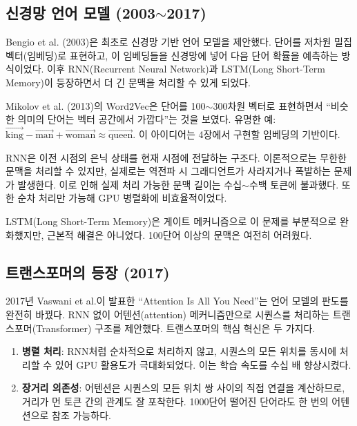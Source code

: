 \subsection{신경망 언어 모델 (2003$\sim$2017)}

Bengio et al. (2003)은 최초로 신경망 기반 언어 모델을 제안했다. 단어를 저차원 밀집 벡터(임베딩)로 표현하고, 이 임베딩들을 신경망에 넣어 다음 단어 확률을 예측하는 방식이었다. 이후 RNN(Recurrent Neural Network)과 LSTM(Long Short-Term Memory)이 등장하면서 더 긴 문맥을 처리할 수 있게 되었다.

\begin{infobox}
Mikolov et al. (2013)의 Word2Vec은 단어를 100$\sim$300차원 벡터로 표현하면서 ``비슷한 의미의 단어는 벡터 공간에서 가깝다''는 것을 보였다. 유명한 예: $\vec{\text{king}} - \vec{\text{man}} + \vec{\text{woman}} \approx \vec{\text{queen}}$. 이 아이디어는 4장에서 구현할 임베딩의 기반이다.
\end{infobox}

\begin{warnbox}[RNN의 한계]
RNN은 이전 시점의 은닉 상태를 현재 시점에 전달하는 구조다. 이론적으로는 무한한 문맥을 처리할 수 있지만, 실제로는 역전파 시 그래디언트가 사라지거나 폭발하는  문제가 발생한다. 이로 인해 실제 처리 가능한 문맥 길이는 수십$\sim$수백 토큰에 불과했다. 또한 순차 처리만 가능해 GPU 병렬화에 비효율적이었다.

LSTM(Long Short-Term Memory)은 게이트 메커니즘으로 이 문제를 부분적으로 완화했지만, 근본적 해결은 아니었다. 100단어 이상의 문맥은 여전히 어려웠다.
\end{warnbox}

\subsection{트랜스포머의 등장 (2017)}

2017년 Vaswani et al.이 발표한 ``Attention Is All You Need''는 언어 모델의 판도를 완전히 바꿨다. RNN 없이 어텐션(attention) 메커니즘만으로 시퀀스를 처리하는 트랜스포머(Transformer) 구조를 제안했다. 트랜스포머의 핵심 혁신은 두 가지다.

\begin{enumerate}
  \item \textbf{병렬 처리}: RNN처럼 순차적으로 처리하지 않고, 시퀀스의 모든 위치를 동시에 처리할 수 있어 GPU 활용도가 극대화되었다. 이는 학습 속도를 수십 배 향상시켰다.
  \item \textbf{장거리 의존성}: 어텐션은 시퀀스의 모든 위치 쌍 사이의 직접 연결을 계산하므로, 거리가 먼 토큰 간의 관계도 잘 포착한다. 1000단어 떨어진 단어라도 한 번의 어텐션으로 참조 가능하다.
\end{enumerate}

